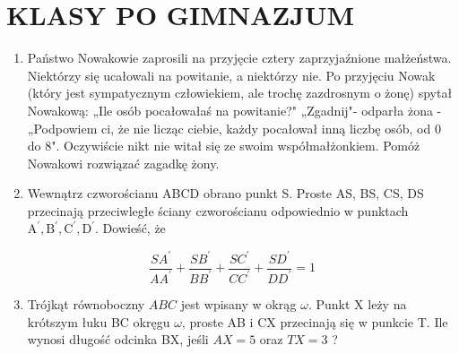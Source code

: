\documentclass[10pt]{article}
\begin{document}
\section*{KLASY PO GIMNAZJUM}
\begin{enumerate}
  \item Państwo Nowakowie zaprosili na przyjęcie cztery zaprzyjaźnione małżeństwa. Niektórzy się ucałowali na powitanie, a niektórzy nie. Po przyjęciu Nowak (który jest sympatycznym człowiekiem, ale trochę zazdrosnym o żonę) spytał Nowakową: „Ile osób pocałowałaś na powitanie?" „Zgadnij"- odparła żona - „Podpowiem ci, że nie licząc ciebie, każdy pocałował inną liczbę osób, od 0 do 8". Oczywiście nikt nie witał się ze swoim współmałżonkiem. Pomóż Nowakowi rozwiązać zagadkę żony.
  \item Wewnątrz czworościanu ABCD obrano punkt S. Proste AS, BS, CS, DS przecinają przeciwległe ściany czworościanu odpowiednio w punktach \(\mathrm{A}^{\prime}, \mathrm{B}^{\prime}, \mathrm{C}^{\prime}, \mathrm{D}^{\prime}\). Dowieść, że
\end{enumerate}

\[
\frac{S A^{\prime}}{A A^{\prime}}+\frac{S B^{\prime}}{B B^{\prime}}+\frac{S C^{\prime}}{C C^{\prime}}+\frac{S D^{\prime}}{D D^{\prime}}=1
\]

\begin{enumerate}
  \setcounter{enumi}{2}
  \item Trójkąt równoboczny \(A B C\) jest wpisany w okrąg \(\omega\). Punkt X leży na krótszym łuku BC okręgu \(\omega\), proste AB i CX przecinają się w punkcie T. Ile wynosi długość odcinka BX, jeśli \(A X=5\) oraz \(T X=3\) ?
\end{enumerate}
\end{document}
